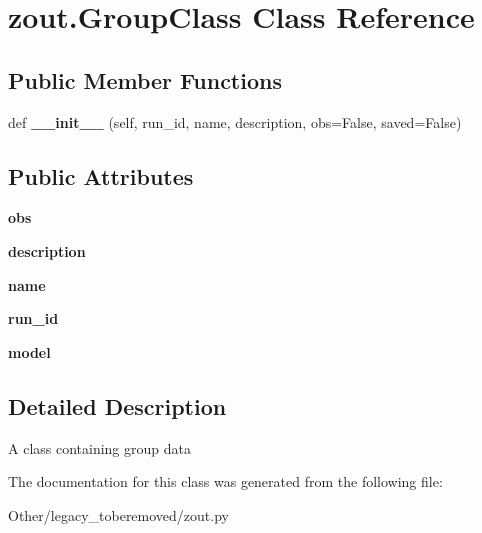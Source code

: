 \hypertarget{classzout_1_1GroupClass}{}\section{zout.\+Group\+Class Class Reference}
\label{classzout_1_1GroupClass}
\subsection*{Public Member Functions}
\begin{DoxyCompactItemize}
\item 
\mbox{\label{classzout_1_1GroupClass_ac106779de4ce37ca287eb00269b7f14f}} 
def {\bfseries \+\_\+\+\_\+init\+\_\+\+\_\+} (self, run\+\_\+id, name, description, obs=False, saved=False)
\end{DoxyCompactItemize}
\subsection*{Public Attributes}
\begin{DoxyCompactItemize}
\item 
\mbox{\label{classzout_1_1GroupClass_a37a643b6a98ef2c65a1f95e48bbbfe9e}} 
{\bfseries obs}
\item 
\mbox{\label{classzout_1_1GroupClass_abe83a2a777885caf21abdd4517671261}} 
{\bfseries description}
\item 
\mbox{\label{classzout_1_1GroupClass_aa2d8b43aef1a3a22cbb362848d915dd2}} 
{\bfseries name}
\item 
\mbox{\label{classzout_1_1GroupClass_a4355c326baa4c31888d7750c01f6773a}} 
{\bfseries run\+\_\+id}
\item 
\mbox{\label{classzout_1_1GroupClass_aaf1f74b3da2fe3849a0aade472954e59}} 
{\bfseries model}
\end{DoxyCompactItemize}


\subsection{Detailed Description}
\begin{DoxyVerb}A class containing group data\end{DoxyVerb}
 

The documentation for this class was generated from the following file\+:\begin{DoxyCompactItemize}
\item 
Other/legacy\+\_\+toberemoved/zout.\+py\end{DoxyCompactItemize}
